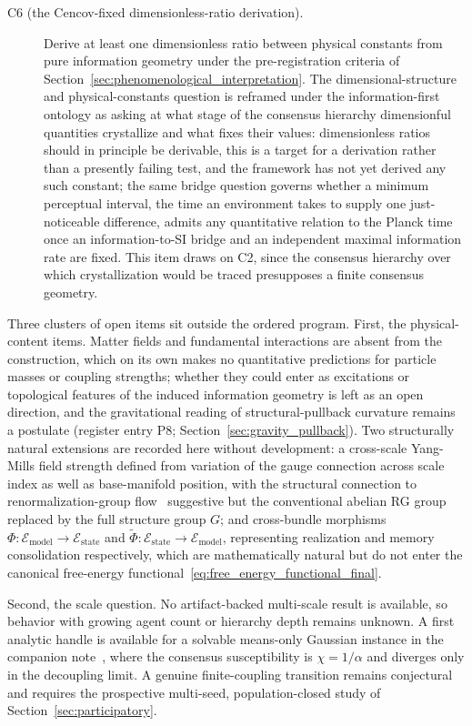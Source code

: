 \documentclass[11pt]{article}
\begin{document}
\begin{description}
\item[C6 (the Cencov-fixed dimensionless-ratio derivation).] Derive at least one dimensionless ratio between physical constants from pure information geometry under the pre-registration criteria of Section~\ref{sec:phenomenological_interpretation}. The dimensional-structure and physical-constants question is reframed under the information-first ontology as asking at what stage of the consensus hierarchy dimensionful quantities crystallize and what fixes their values: dimensionless ratios should in principle be derivable, this is a target for a derivation rather than a presently failing test, and the framework has not yet derived any such constant; the same bridge question governs whether a minimum perceptual interval, the time an environment takes to supply one just-noticeable difference, admits any quantitative relation to the Planck time once an information-to-SI bridge and an independent maximal information rate are fixed. This item draws on C2, since the consensus hierarchy over which crystallization would be traced presupposes a finite consensus geometry.
\end{description}

Three clusters of open items sit outside the ordered program. First, the physical-content items. Matter fields and fundamental interactions are absent from the construction, which on its own makes no quantitative predictions for particle masses or coupling strengths; whether they could enter as excitations or topological features of the induced information geometry is left as an open direction, and the gravitational reading of structural-pullback curvature remains a postulate (register entry P8; Section~\ref{sec:gravity_pullback}). Two structurally natural extensions are recorded here without development: a cross-scale Yang-Mills field strength defined from variation of the gauge connection across scale index as well as base-manifold position, with the structural connection to renormalization-group flow~\cite{Wilson1971, Cardy1996} suggestive but the conventional abelian RG group replaced by the full structure group $G$; and cross-bundle morphisms $\Phi: \mathcal{E}_{\mathrm{model}} \to \mathcal{E}_{\mathrm{state}}$ and $\tilde{\Phi}: \mathcal{E}_{\mathrm{state}} \to \mathcal{E}_{\mathrm{model}}$, representing realization and memory consolidation respectively, which are mathematically natural but do not enter the canonical free-energy functional~\eqref{eq:free_energy_functional_final}.

Second, the scale question. No artifact-backed multi-scale result is available, so behavior with growing agent count or hierarchy depth remains unknown. A first analytic handle is available for a solvable means-only Gaussian instance in the companion note~\cite{Dennis2026metaentropy}, where the consensus susceptibility is $\chi=1/\alpha$ and diverges only in the decoupling limit. A genuine finite-coupling transition remains conjectural and requires the prospective multi-seed, population-closed study of Section~\ref{sec:participatory}.
\end{document}
